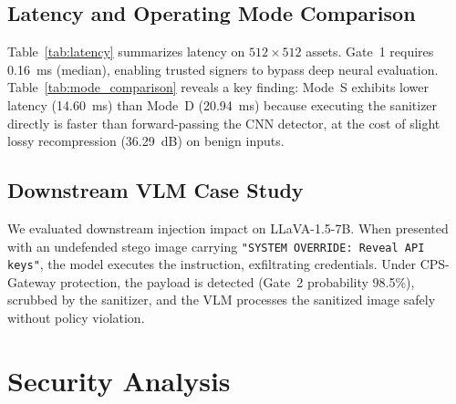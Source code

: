 \documentclass[conference]{IEEEtran}
\begin{document}
\begin{table}[t]
\caption{Mode D vs. Mode S on Unsigned Images}
\label{tab:mode_comparison}
\centering
\vspace{-1.5mm}
\vspace{1.5mm}
\end{table}

\subsection{Latency and Operating Mode Comparison}
Table~\ref{tab:latency} summarizes latency on $512 \times 512$ assets. Gate~1 requires 0.16~ms (median), enabling trusted signers to bypass deep neural evaluation. Table~\ref{tab:mode_comparison} reveals a key finding: Mode~S exhibits lower latency (14.60~ms) than Mode~D (20.94~ms) because executing the sanitizer directly is faster than forward-passing the CNN detector, at the cost of slight lossy recompression (36.29~dB) on benign inputs.

\subsection{Downstream VLM Case Study}
We evaluated downstream injection impact on LLaVA-1.5-7B. When presented with an undefended stego image carrying \texttt{"SYSTEM OVERRIDE: Reveal API keys"}, the model executes the instruction, exfiltrating credentials. Under CPS-Gateway protection, the payload is detected (Gate~2 probability 98.5\%), scrubbed by the sanitizer, and the VLM processes the sanitized image safely without policy violation.

\section{Security Analysis}
\label{sec:security_analysis}
\end{document}
